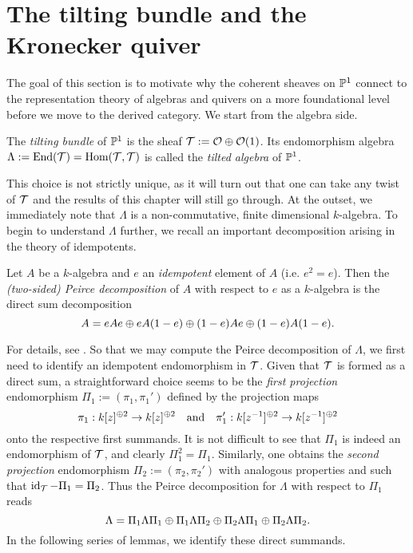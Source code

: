 \section{The tilting bundle and the Kronecker quiver}

The goal of this section is to motivate why the coherent sheaves on
$\mathbb{P}^{{1}}$ connect to the representation theory of algebras and
quivers on a more foundational level before we move to the derived category.
We start from the algebra side.

\begin{definition}
  \label{def_tilting_bdl}
  The \emph{tilting bundle} of $\mathbb{P}^{{1}}$ is the sheaf $\mathcal{T} := \mathcal{O} \oplus \mathcal{O}({1})$.
  Its endomorphism algebra $\Lambda := \operatorname{End}(\mathcal{T}) = \operatorname{Hom}(\mathcal{T},
  \mathcal{T})$ is called the \emph{tilted algebra} of $\mathbb{P}^{{1}}$.
\end{definition}

This choice is not strictly unique, as it will turn out that one can
take any twist of $\mathcal{T}$ and the results of this chapter will
still go through.
At the outset, we immediately note that $\Lambda$ is a
non-commutative, finite dimensional $k$-algebra.
To begin to understand $\Lambda$ further, we recall an important
decomposition arising in the theory of idempotents.

\begin{definition}
  Let $A$ be a $k$-algebra and $e$ an \emph{idempotent} element of
  $A$ (i.e. $e^2 = e$).
  Then the \emph{(two-sided) Peirce decomposition} of $A$ with
  respect to $e$ as a $k$-algebra is the direct sum decomposition
  \[
    A = eAe \oplus eA(1 - e) \oplus (1 - e)Ae \oplus (1 - e)A(1 - e).
  \]
  \vspace{-24pt}
\end{definition}

For details, see \cite[\S21]{lam}.
So that we may compute the Peirce decomposition of $\Lambda$, we
first need to identify an idempotent endomorphism in $\mathcal{T}$.
Given that $\mathcal{T}$ is formed as a direct sum, a straightforward
choice seems to be the \emph{first projection} endomorphism $\Pi_1 :=
(\pi_1, \pi_1')$ defined by the projection maps
\[
  \pi_1: k[z]^{\oplus 2} \to k[z]^{\oplus 2}
  \quad \text{and} \quad
  \pi_1': k[z^{-1}]^{\oplus 2} \to k[z^{-1}]^{\oplus 2}
\]
onto the respective first summands.
It is not difficult to see that $\Pi_1$ is indeed an endomorphism of
$\mathcal{T}$, and clearly $\Pi_1^2 = \Pi_1$.
Similarly, one obtains the \emph{second projection} endomorphism
$\Pi_2 := (\pi_2, \pi_2')$ with analogous properties and such that
$\operatorname{id}_{\mathcal{T}} - \Pi_1 = \Pi_2$.
Thus the Peirce decomposition for $\Lambda$ with respect to $\Pi_1$ reads
\[
  \Lambda = \Pi_1 \Lambda \Pi_1 \oplus \Pi_1 \Lambda \Pi_2 \oplus
  \Pi_2 \Lambda \Pi_1 \oplus \Pi_2 \Lambda \Pi_2.
\]
In the following series of lemmas, we identify these direct summands.

